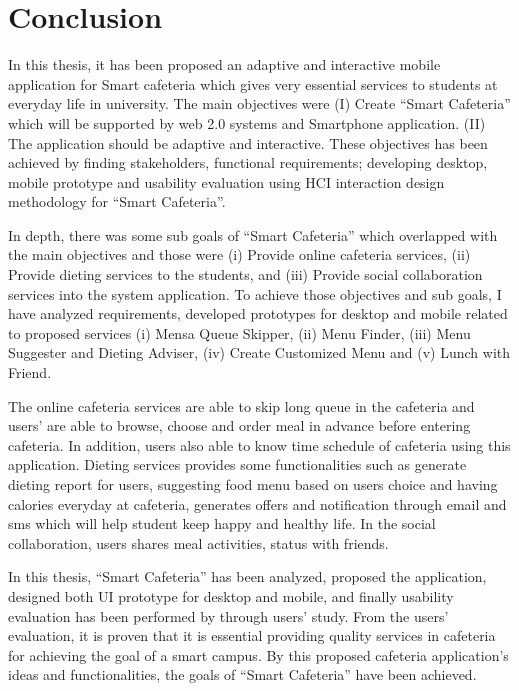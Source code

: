 \chapter{Conclusion}
\label{chap:Conclusion}
In this thesis, it has been proposed an adaptive and interactive mobile
application for Smart cafeteria which gives very essential services to students
at everyday life in university. The main objectives were (I) Create ``Smart
Cafeteria'' which will be supported by web 2.0 systems and Smartphone
application. (II) The application should be adaptive and interactive. These
objectives has been achieved by finding stakeholders, functional requirements;
developing desktop, mobile prototype and usability evaluation using HCI
interaction design methodology for ``Smart Cafeteria''.


In depth, there was some sub goals of ``Smart Cafeteria'' which overlapped with
the main objectives and those were (i) Provide online cafeteria services, (ii)
Provide dieting services to the students, and (iii) Provide social collaboration
services into the system application. To achieve those objectives and sub goals,
I have analyzed requirements, developed prototypes for desktop and mobile
related to proposed services (i) Mensa Queue Skipper, (ii) Menu Finder, (iii)
Menu Suggester and Dieting Adviser, (iv) Create Customized Menu and (v) Lunch
with Friend.


The online cafeteria services are able to skip long queue in the cafeteria and
users' are able to browse, choose and order meal in advance before entering
cafeteria. In addition, users also able to know time schedule of cafeteria using
this application. Dieting services provides some functionalities such as
generate dieting report for users, suggesting food menu based on users choice
and having calories everyday at cafeteria, generates offers and notification
through email and sms which will help student keep happy and healthy life. In
the social collaboration, users shares meal activities, status with friends.


In this thesis, ``Smart Cafeteria'' has been analyzed, proposed the application,
designed both UI prototype for desktop and mobile, and finally usability
evaluation has been performed by through users' study. From the users'
evaluation, it is proven that it is essential providing quality services in
cafeteria for achieving the goal of a smart campus. By this proposed cafeteria
application's ideas and functionalities, the goals of ``Smart Cafeteria'' have
been achieved.


